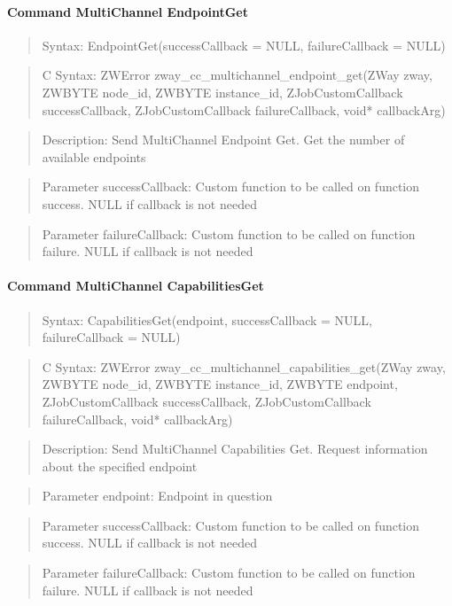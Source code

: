 \paragraph{Command MultiChannel EndpointGet}
\begin{quote}Syntax: EndpointGet(successCallback = NULL, failureCallback = NULL)\end{quote}
\begin{quote}C Syntax: ZWError zway\_cc\_multichannel\_endpoint\_get(ZWay zway, ZWBYTE node\_id, ZWBYTE instance\_id, ZJobCustomCallback successCallback, ZJobCustomCallback failureCallback, void* callbackArg)\end{quote}
\begin{quote}Description: Send MultiChannel Endpoint Get. Get the number of available endpoints\end{quote}
\begin{quote}Parameter successCallback: Custom function to be called on function success. NULL if callback is not needed\end{quote}
\begin{quote}Parameter failureCallback: Custom function to be called on function failure. NULL if callback is not needed\end{quote}


\paragraph{Command MultiChannel CapabilitiesGet}
\begin{quote}Syntax: CapabilitiesGet(endpoint, successCallback = NULL, failureCallback = NULL)\end{quote}
\begin{quote}C Syntax: ZWError zway\_cc\_multichannel\_capabilities\_get(ZWay zway, ZWBYTE node\_id, ZWBYTE instance\_id, ZWBYTE endpoint, ZJobCustomCallback successCallback, ZJobCustomCallback failureCallback, void* callbackArg)\end{quote}
\begin{quote}Description: Send MultiChannel Capabilities Get. Request information about the specified endpoint\end{quote}
\begin{quote}Parameter endpoint: Endpoint in question\end{quote}
\begin{quote}Parameter successCallback: Custom function to be called on function success. NULL if callback is not needed\end{quote}
\begin{quote}Parameter failureCallback: Custom function to be called on function failure. NULL if callback is not needed\end{quote}


